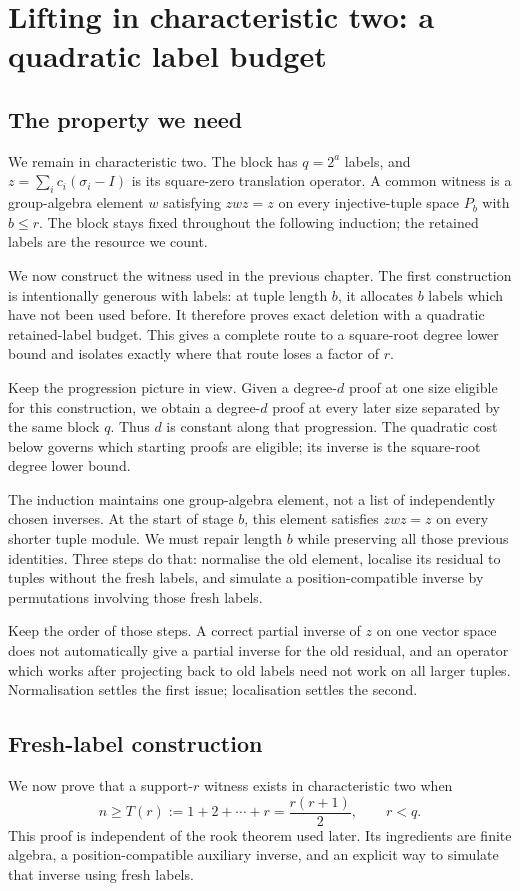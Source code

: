 \documentclass[11pt,a4paper,oneside,openany]{book}
\theoremstyle{definition}\newtheorem{definition}[theorem]{Definition}
\theoremstyle{remark}\newtheorem{remark}[theorem]{Remark}
\numberwithin{equation}{chapter}
\begin{document}
\chapter{Lifting in characteristic two: a quadratic label budget}\label{tx:sec:quadratic-route}
\label{tx:ch:quadratic}
\section*{The property we need}
We remain in characteristic two. The block has $q=2^a$ labels,
and $z=\sum_i c_i(\sigma_i-I)$ is its square-zero translation
operator. A common witness is a group-algebra element $w$ satisfying
$zwz=z$ on every injective-tuple space $P_b$ with $b\le r$.
The block stays fixed throughout the following induction; the
retained labels are the resource we count.

We now construct the witness used in the previous chapter. The first
construction is intentionally generous with labels: at tuple length
$b$, it allocates $b$ labels which have not been used before. It
therefore proves exact deletion with a quadratic retained-label
budget. This gives a complete route to a square-root degree lower
bound and isolates exactly where that route loses a factor of $r$.

Keep the progression picture in view. Given a degree-$d$ proof at
one size eligible for this construction, we obtain a degree-$d$ proof
at every later size separated by the same block $q$. Thus $d$ is constant along
that progression. The quadratic cost below governs which starting
proofs are eligible; its inverse is the square-root degree lower bound.

The induction maintains one group-algebra element, not a list of
independently chosen inverses. At the start of stage $b$, this element
satisfies $zwz=z$ on every shorter tuple module. We must repair length
$b$ while preserving all those previous identities. Three steps do
that: normalise the old element, localise its residual to tuples
without the fresh labels, and simulate a position-compatible inverse
by permutations involving those fresh labels.

Keep the order of those steps. A correct partial inverse of $z$ on one
vector space does not automatically give a partial inverse for the old residual, and an
operator which works after projecting back to old labels need not
work on all larger tuples. Normalisation settles the first issue;
localisation settles the second.

\section{Fresh-label construction}\label{tx:sec:quadratic}
We now prove that a support-$r$ witness exists in characteristic two when
\[n\ge T(r):=1+2+\cdots+r=\frac{r(r+1)}2,\qquad r<q.\]
This proof is independent of the rook theorem used later. Its ingredients are finite algebra, a position-compatible auxiliary inverse, and an explicit way to simulate that inverse using fresh labels.
\end{document}
